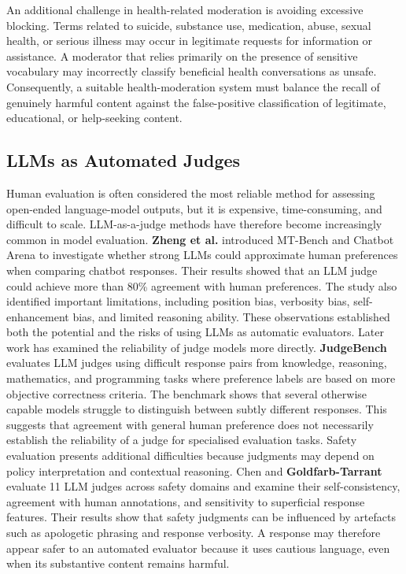 \documentclass[11pt,a4paper]{article}
\begin{document}
An additional challenge in health-related moderation is avoiding excessive blocking. Terms related to suicide, substance use, medication, abuse, sexual health, or serious illness may occur in legitimate requests for information or assistance. A moderator that relies primarily on the presence of sensitive vocabulary may incorrectly classify beneficial health conversations as unsafe. Consequently, a suitable health-moderation system must balance the recall of genuinely harmful content against the false-positive classification of legitimate, educational, or help-seeking content.


\subsection{LLMs as Automated Judges}
Human evaluation is often considered the most reliable method for assessing open-ended language-model outputs, but it is expensive, time-consuming, and difficult to scale. LLM-as-a-judge methods have therefore become increasingly common in model evaluation.
\textbf{Zheng et al.} \cite{zheng2023judging} introduced MT-Bench and Chatbot Arena to investigate whether strong LLMs could approximate human preferences when comparing chatbot responses. Their results showed that an LLM judge could achieve more than 80\% agreement with human preferences. The study also identified important limitations, including position bias, verbosity bias, self-enhancement bias, and limited reasoning ability. These observations established both the potential and the risks of using LLMs as automatic evaluators.
Later work has examined the reliability of judge models more directly. \textbf{JudgeBench} \cite{tan2024judgebench} evaluates LLM judges using difficult response pairs from knowledge, reasoning, mathematics, and programming tasks where preference labels are based on more objective correctness criteria. The benchmark shows that several otherwise capable models struggle to distinguish between subtly different responses. This suggests that agreement with general human preference does not necessarily establish the reliability of a judge for specialised evaluation tasks.
Safety evaluation presents additional difficulties because judgments may depend on policy interpretation and contextual reasoning. Chen and \textbf{Goldfarb-Tarrant} \cite{chen2025safer} evaluate 11 LLM judges across safety domains and examine their self-consistency, agreement with human annotations, and sensitivity to superficial response features. Their results show that safety judgments can be influenced by artefacts such as apologetic phrasing and response verbosity. A response may therefore appear safer to an automated evaluator because it uses cautious language, even when its substantive content remains harmful.
\end{document}
